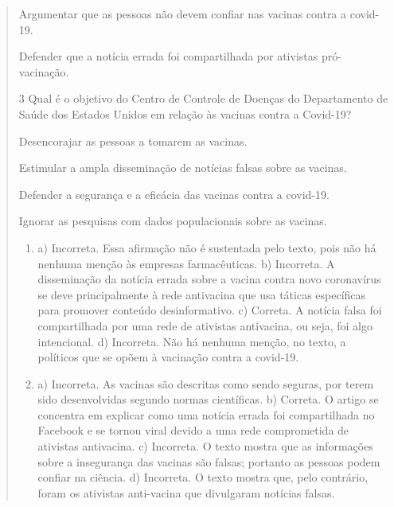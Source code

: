 \begin{quote}
\begin{escolha}
\item Argumentar que as pessoas não devem confiar nas vacinas contra a covid-19.

\item Defender que a notícia errada foi compartilhada por ativistas pró-vacinação.
\end{escolha}


\num{3} Qual é o objetivo do Centro de Controle de Doenças do Departamento de Saúde dos Estados
Unidos em relação às vacinas contra a Covid-19?

\begin{escolha}
\item Desencorajar as pessoas a tomarem as vacinas.

\item Estimular a ampla disseminação de notícias falsas sobre as vacinas.

\item Defender a segurança e a eficácia das vacinas contra a covid-19.

\item Ignorar as pesquisas com dados populacionais sobre as vacinas.
\end{escolha}



\begin{enumerate}
\item
a) Incorreta. Essa afirmação não é sustentada pelo texto, pois não há
nenhuma menção às empresas farmacêuticas.
b) Incorreta. A disseminação da notícia errada sobre a vacina contra novo coronavírus se deve principalmente à rede antivacina que usa táticas
específicas para promover conteúdo desinformativo.
c) Correta. A notícia falsa foi compartilhada por uma rede de ativistas
antivacina, ou seja, foi algo intencional.
d) Incorreta. Não há nenhuma menção, no texto, a políticos que se opõem à vacinação
contra a covid-19.

\item
a) Incorreta. As vacinas são descritas como sendo seguras, por terem
sido desenvolvidas segundo normas científicas.
b) Correta. O artigo se concentra em explicar como uma notícia errada
foi compartilhada no Facebook e se tornou viral devido a uma rede
comprometida de ativistas antivacina.
c) Incorreta. O texto mostra que as informações sobre a insegurança das
vacinas são falsas; portanto as pessoas podem confiar na ciência.
d) Incorreta. O texto mostra que, pelo contrário, foram os ativistas
anti-vacina que divulgaram notícias falsas.


\end{enumerate}
\end{quote}
